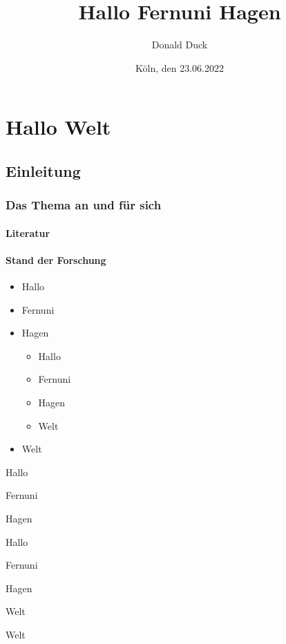 \documentclass[12pt,ngerman,parskip=half]{scrreprt}
\author{Donald Duck}
\title{Hallo Fernuni Hagen}
\date{Köln, den 23.06.2022}
\begin{document}
\maketitle

\tableofcontents

\chapter{Hallo Welt}

\section{Einleitung}
\subsection{Das Thema an und für sich}
\subsubsection{Literatur}

\blindtext[1] 

\subsubsection{Stand der Forschung}

\blindtext[1] 


\begin{itemize} %
\item Hallo
\item Fernuni
\item Hagen
\begin{itemize}[+]
\item Hallo
\item Fernuni
\item Hagen
\item Welt
\end{itemize}
\item Welt
\end{itemize}

\begin{compactitem}[\%] %
\item Hallo
\item Fernuni
\item Hagen
\begin{compactitem}[+]
\item Hallo
\item Fernuni
\item Hagen
\item Welt
\end{compactitem}
\item Welt
\end{compactitem}
\end{document}

